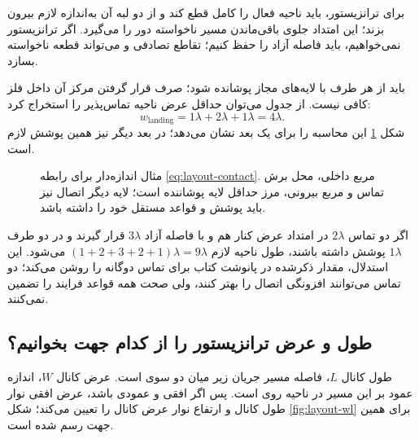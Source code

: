 برای ترانزیستور،  باید ناحیه فعال را کامل قطع کند و از دو لبه آن
به‌اندازه لازم بیرون بزند؛ این امتداد جلوی باقی‌ماندن مسیر ناخواسته دور 
را می‌گیرد. اگر ترانزیستور نمی‌خواهیم، باید فاصله آزاد را حفظ کنیم؛
تقاطع تصادفی  و  می‌تواند قطعه ناخواسته بسازد.

 باید از هر طرف با لایه‌های مجاز پوشانده شود؛ صرف قرار گرفتن
مرکز آن داخل فلز کافی نیست. از جدول می‌توان حداقل عرض ناحیه تماس‌پذیر را استخراج کرد:
\begin{equation}\label{eq:layout-contact}
w_{\mathrm{landing}}=1\lambda+2\lambda+1\lambda=4\lambda.
\end{equation}
شکل \ref{fig:layout-contact} این محاسبه را برای یک بعد نشان می‌دهد؛
در بعد دیگر نیز همین پوشش لازم است.

\begin{figure}[ht]
\centering
\begin{latin}
\PersianMathDigits
{}
\end{latin}
\caption{مثال اندازه‌دار برای رابطه \eqref{eq:layout-contact}.
مربع داخلی، محل برش تماس و مربع بیرونی، مرز حداقل لایه پوشاننده است؛
لایه دیگر اتصال نیز باید پوشش و قواعد مستقل خود را داشته باشد.}
\label{fig:layout-contact}
\end{figure}

اگر دو تماس \(2\lambda\) در امتداد عرض کنار هم و با فاصله آزاد
\(3\lambda\) قرار گیرند و در دو طرف \(1\lambda\) پوشش داشته باشند،
طول ناحیه لازم \((1+2+3+2+1)\lambda=9\lambda\) می‌شود.
این استدلال، مقدار ذکرشده در پانوشت کتاب برای تماس دوگانه را روشن می‌کند؛
دو تماس می‌توانند افزونگی اتصال را بهتر کنند، ولی صحت همه قواعد فرایند را تضمین نمی‌کنند.

\subsection{طول و عرض ترانزیستور را از کدام جهت بخوانیم؟}
طول کانال \(L\)، فاصله مسیر جریان زیر  میان دو سوی
 است. عرض کانال \(W\)، اندازه عمود بر این مسیر در ناحیه
 روی  است.
پس اگر  افقی و  عمودی باشد، عرض افقی نوار 
طول کانال و ارتفاع نوار  عرض کانال را تعیین می‌کند؛
شکل \ref{fig:layout-wl} برای همین جهت رسم شده است.

